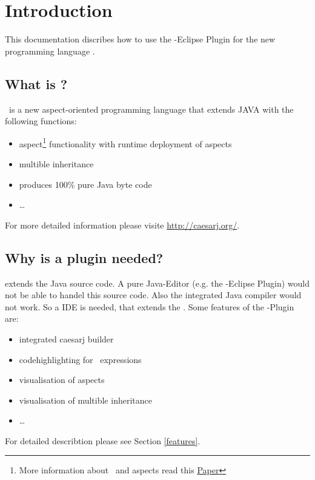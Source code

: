 \section{Introduction}
This documentation discribes how to use the \caesarj -Eclipse Plugin for the new programming language \caesarj.
\subsection{What is \caesarj ?}
\caesar ~is a new aspect-oriented programming language that extends JAVA with the following functions:
\begin{itemize}
	\item aspect\footnote{More information about \caesarj ~and aspects read this  \href{http://www.st.informatik.tu-darmstadt.de/database/publications/data/aosd03.pdf?id=70}{Paper}} functionality with runtime deployment of aspects
	\item multible inheritance
	\item produces 100\% pure Java byte code
	\item \dots
\end{itemize}
For more detailed information please visite \href{http://caesarj.org/}{http://caesarj.org/}.

\subsection{Why is a plugin needed?}
\caesarj  extends the Java source code. A pure Java-Editor (e.g. the \jdt -Eclipse Plugin) would not be able to handel this source code. Also the integrated Java compiler would not work. So a IDE is needed, that extends the \jdt. Some features of the \caesarj -Plugin are:
\begin{itemize}
	\item integrated caesarj builder
	\item codehighlighting for \caesarj ~expressions
	\item visualisation of aspects
	\item visualisation of multible inheritance
	\item \dots
\end{itemize}
For detailed describtion please see Section \ref{features}.


